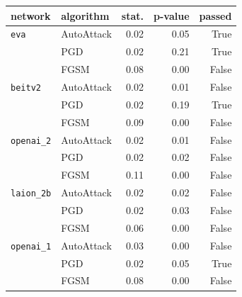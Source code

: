 \begin{tabular}{llrrr}
\toprule
network & algorithm & stat. & p-value & passed \\
\midrule
\texttt{eva} & AutoAttack & 0.02 & 0.05 & True \\
 & PGD & 0.02 & 0.21 & True \\
 & FGSM & 0.08 & 0.00 & False \\
\texttt{beitv2} & AutoAttack & 0.02 & 0.01 & False \\
 & PGD & 0.02 & 0.19 & True \\
 & FGSM & 0.09 & 0.00 & False \\
\texttt{openai\_2} & AutoAttack & 0.02 & 0.01 & False \\
 & PGD & 0.02 & 0.02 & False \\
 & FGSM & 0.11 & 0.00 & False \\
\texttt{laion\_2b} & AutoAttack & 0.02 & 0.02 & False \\
 & PGD & 0.02 & 0.03 & False \\
 & FGSM & 0.06 & 0.00 & False \\
\texttt{openai\_1} & AutoAttack & 0.03 & 0.00 & False \\
 & PGD & 0.02 & 0.05 & True \\
 & FGSM & 0.08 & 0.00 & False \\
\bottomrule
\end{tabular}
